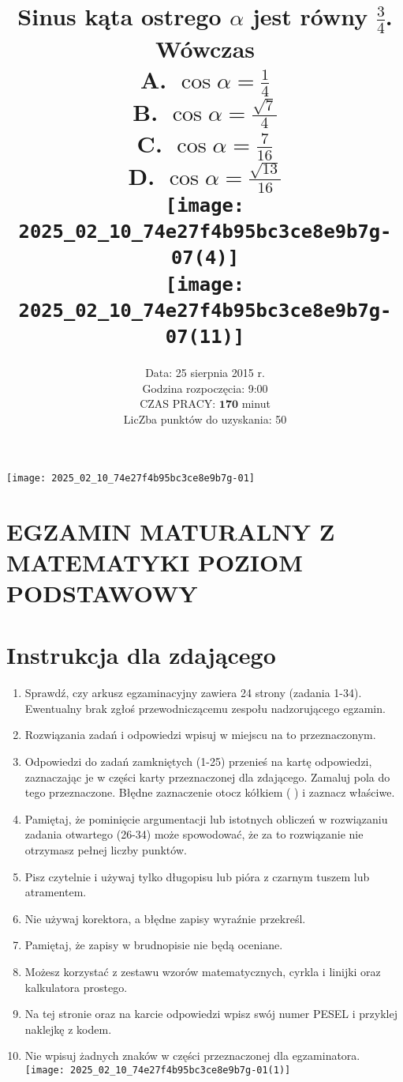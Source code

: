 \documentclass[10pt]{article}
\title{Sinus kąta ostrego \(\alpha\) jest równy \(\frac{3}{4}\). Wówczas\\
A. \(\cos \alpha=\frac{1}{4}\)\\
B. \(\cos \alpha=\frac{\sqrt{7}}{4}\)\\
C. \(\cos \alpha=\frac{7}{16}\)\\
D. \(\cos \alpha=\frac{\sqrt{13}}{16}\)\\
\(\qquad\)\\
\texttt{[image: 2025\_02\_10\_74e27f4b95bc3ce8e9b7g-07(4)]}\\
\(\qquad\)\\
\texttt{[image: 2025\_02\_10\_74e27f4b95bc3ce8e9b7g-07(11)]}}
\author{Data: 25 sierpnia 2015 r.\\
Godzina rozpoczęcia: 9:00\\
CZAS PRACY: \(\mathbf{1 7 0}\) minut\\
LicZba punktów do uzyskania: 50}
\date{}
\begin{document}
\maketitle
\begin{center}
\texttt{[image: 2025\_02\_10\_74e27f4b95bc3ce8e9b7g-01]}
\end{center}

\section*{EGZAMIN MATURALNY Z MATEMATYKI POZIOM PODSTAWOWY}


\section*{Instrukcja dla zdającego}
\begin{enumerate}
  \item Sprawdź, czy arkusz egzaminacyjny zawiera 24 strony (zadania 1-34). Ewentualny brak zgłoś przewodniczącemu zespołu nadzorującego egzamin.
  \item Rozwiązania zadań i odpowiedzi wpisuj w miejscu na to przeznaczonym.
  \item Odpowiedzi do zadań zamkniętych (1-25) przenieś na kartę odpowiedzi, zaznaczając je w części karty przeznaczonej dla zdającego. Zamaluj pola do tego przeznaczone. Błędne zaznaczenie otocz kółkiem ( ) i zaznacz właściwe.
  \item Pamiętaj, że pominięcie argumentacji lub istotnych obliczeń w rozwiązaniu zadania otwartego (26-34) może spowodować, że za to rozwiązanie nie otrzymasz pełnej liczby punktów.
  \item Pisz czytelnie i używaj tylko długopisu lub pióra z czarnym tuszem lub atramentem.
  \item Nie używaj korektora, a błędne zapisy wyraźnie przekreśl.
  \item Pamiętaj, że zapisy w brudnopisie nie będą oceniane.
  \item Możesz korzystać z zestawu wzorów matematycznych, cyrkla i linijki oraz kalkulatora prostego.
  \item Na tej stronie oraz na karcie odpowiedzi wpisz swój numer PESEL i przyklej naklejkę z kodem.
  \item Nie wpisuj żadnych znaków w części przeznaczonej dla egzaminatora.\\
\texttt{[image: 2025\_02\_10\_74e27f4b95bc3ce8e9b7g-01(1)]}
\end{enumerate}
\end{document}
